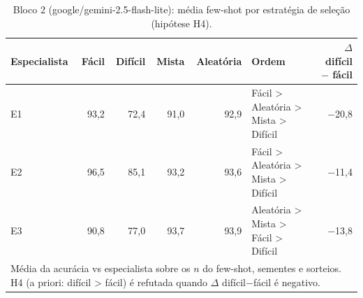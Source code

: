 \begin{table}[htbp]
\centering
\small
\caption{Bloco 2 (google/gemini-2.5-flash-lite): média few-shot por estratégia de seleção (hipótese H4).}
\label{tab:bloco2_E_H4_media_fewshot_por_estrategia_flashlite}
\begin{tabular}{lrrrrlr}
\toprule
Especialista & Fácil & Difícil & Mista & Aleatória & Ordem & $\Delta$ difícil $-$ fácil \\
\midrule
E1 & 93,2 & 72,4 & 91,0 & 92,9 & Fácil > Aleatória > Mista > Difícil & $-$20,8 \\
E2 & 96,5 & 85,1 & 93,2 & 93,6 & Fácil > Aleatória > Mista > Difícil & $-$11,4 \\
E3 & 90,8 & 77,0 & 93,7 & 93,9 & Aleatória > Mista > Fácil > Difícil & $-$13,8 \\
\bottomrule
\multicolumn{7}{p{0.95\linewidth}}{\footnotesize Média da acurácia vs especialista sobre os $n$ do few-shot, sementes e sorteios. H4 (a priori: difícil > fácil) é refutada quando $\Delta$ difícil$-$fácil é negativo.} \\
\end{tabular}
\end{table}
